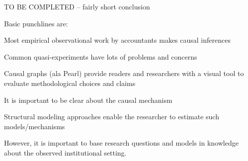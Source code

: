 \documentclass[11pt,reqno]{amsart}
\begin{document}
TO BE COMPLETED -- fairly short conclusion


Basic punchlines are:

Most empirical observational work by accountants makes causal inferences

Common quasi-experiments have lots of problems and concerns

Causal graphs (ala Pearl) provide readers and researchers with a visual tool to evaluate methodological choices and claims

It is important to be clear about the causal mechanism

Structural modeling approaches enable the researcher to estimate such models/mechanisms

However, it is important to base research questions and models in knowledge about the observed institutional setting.






\clearpage


\clearpage



\clearpage

\end{document}
